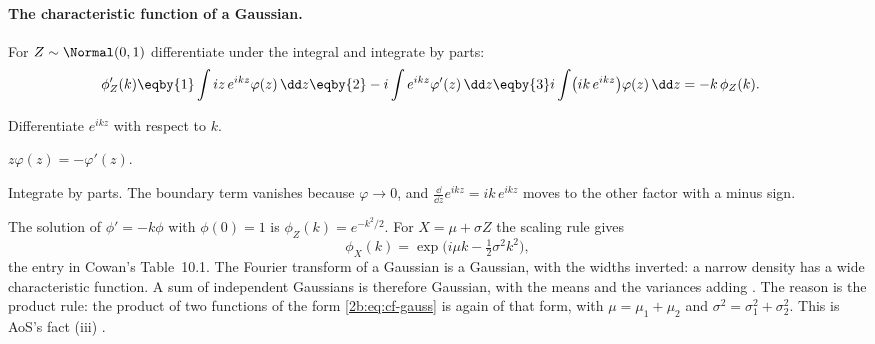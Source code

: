 \paragraph{The characteristic function of a Gaussian.} For $Z\sim\Normal(0,1)$ differentiate under the integral and integrate by parts:
\begin{align}
  \phi_Z'(k)
  &\eqby{1} \int iz\,e^{ikz}\varphi(z)\,\dd z
  \eqby{2} -i\int e^{ikz}\varphi'(z)\,\dd z
  \eqby{3} i\int \bigl(ik\,e^{ikz}\bigr)\varphi(z)\,\dd z
  = -k\,\phi_Z(k) .
  \label{2b:eq:cf-gauss-ode}
\end{align}
\begin{explain}
  \item Differentiate $e^{ikz}$ with respect to $k$.
  \item $z\varphi(z)=-\varphi'(z)$.
  \item Integrate by parts. The boundary term vanishes because $\varphi\to0$, and $\frac{\dd}{\dd z}e^{ikz}=ik\,e^{ikz}$ moves to the other factor with a minus sign.
\end{explain}
The solution of $\phi'=-k\phi$ with $\phi(0)=1$ is $\phi_Z(k)=e^{-k^2/2}$. For $X=\mu+\sigma Z$ the scaling rule gives
\begin{equation}
  \phi_X(k)=\exp\bigl(i\mu k-\tfrac12\sigma^2k^2\bigr) ,
  \label{2b:eq:cf-gauss}
\end{equation}
the entry in Cowan's Table~10.1. The Fourier transform of a Gaussian is a Gaussian, with the widths inverted: a narrow density has a wide characteristic function. A sum of independent Gaussians is therefore Gaussian, with the means and the variances adding . The reason is the product rule: the product of two functions of the form \eqref{2b:eq:cf-gauss} is again of that form, with $\mu=\mu_1+\mu_2$ and $\sigma^2=\sigma_1^2+\sigma_2^2$. This is AoS's fact (iii) .

